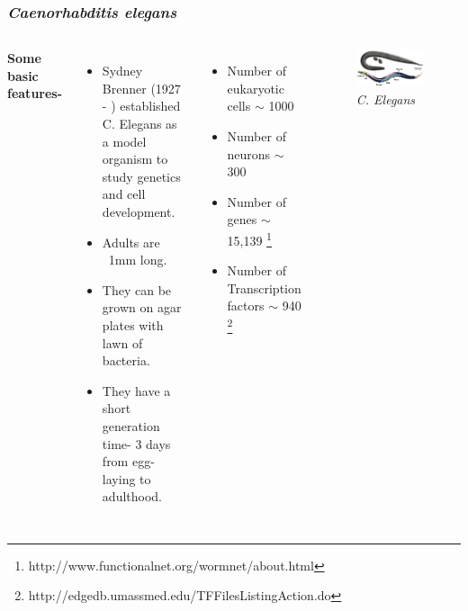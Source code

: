 \documentclass{beamer}
\begin{document}
\begin{frame}
\frametitle{\textit{Caenorhabditis elegans}}
\begin{columns}[c] %

\textbf{Some basic features-}
\begin{itemize}
\item Sydney Brenner (1927 - ) established C. Elegans as a model organism to study genetics and cell development.
\item Adults are ~1mm long.
\item They can be grown on agar plates with lawn of bacteria.
\item They have a short generation time- 3 days from egg-laying to adulthood. 
\end{itemize}

\begin{itemize}
\item {Number of eukaryotic cells \color{green}$ \sim $ 1000} 
\item {Number of neurons \color{green} $ \sim $ 300} 
\item {Number of genes \color{red} $ \sim $ 15,139} \footnote{http://www.functionalnet.org/wormnet/about.html}
\item {Number of Transcription factors \color{red} $ \sim $ 940} \footnote{ http://edgedb.umassmed.edu/TFFilesListingAction.do}
\end{itemize}

\begin{figure}[!htb]
\centering
	\includegraphics[scale=.2]{diagrams/celegans_image2.jpg}
	\caption{\textit{C. Elegans}}
	\label{fig:cElegans}
\end{figure}

\end{columns}
\end{frame}
\end{document}
